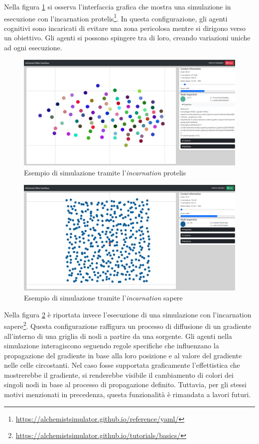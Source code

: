 Nella figura \cref{fig:protelis-example} si osserva l'interfaccia grafica che mostra una simulazione in esecuzione con l'incarnation protelis\footnote{\url{https://alchemistsimulator.github.io/reference/yaml/}}. In questa configurazione, gli agenti cognitivi sono incaricati di evitare una zona pericolosa mentre si dirigono verso un obiettivo. Gli agenti si possono spingere tra di loro, creando variazioni uniche ad ogni esecuzione.
\begin{figure}
	\centering
	\includegraphics[scale=0.22]{imgs/screens/example_protelis.png}
	\caption{Esempio di simulazione tramite l'\textit{incarnation} protelis}
	\label{fig:protelis-example}
\end{figure}
\begin{figure}
	\centering
	\includegraphics[scale=0.22]{imgs/screens/example_sapere.png}
	\caption{Esempio di simulazione tramite l'\textit{incarnation} sapere}
	\label{fig:sapere-example}
\end{figure}


Nella figura \cref{fig:sapere-example} è riportata invece l'esecuzione di una simulazione con l'incarnation sapere\footnote{\url{https://alchemistsimulator.github.io/tutorials/basics/}}. Questa configurazione raffigura un processo di diffusione di un gradiente all'interno di una griglia di nodi a partire da una sorgente. Gli agenti nella simulazione interagiscono seguendo regole specifiche che influenzano la propagazione del gradiente in base alla loro posizione e al valore del gradiente nelle celle circostanti. 
Nel caso fosse supportata graficamente l'effettistica che mostrerebbe il gradiente, si renderebbe visibile il cambiamento di colori dei singoli nodi in base al processo di propagazione definito. Tuttavia, per gli stessi motivi menzionati in precedenza, questa funzionalità è rimandata a lavori futuri.

